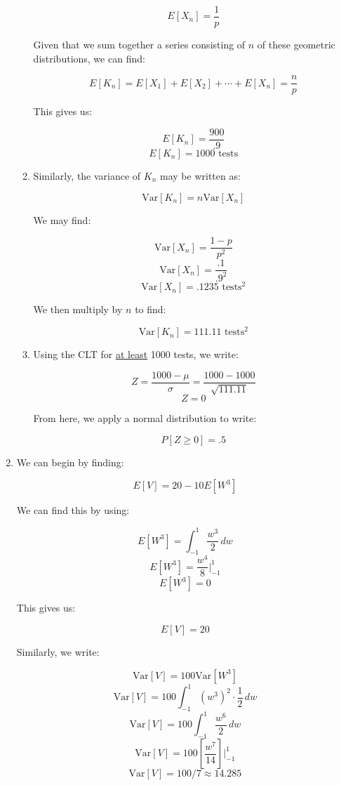 \begin{enumerate}
\begin{enumerate}
        $$E[X_n]=\frac{1}{p}$$

        Given that we sum together a series consisting of $n$ of these geometric distributions, we can find:

        $$E[K_n]=E[X_1]+E[X_2]+\cdots+E[X_n]=\frac{n}{p}$$

        This gives us:

        $$E[K_n]=\frac{900}{.9}$$
        $$\boxed{E[K_n]=1000\text{ tests}}$$

      \item Similarly, the variance of $K_n$ may be written as:

        $$\text{Var}[K_n]=n\text{Var}[X_n]$$

        We may find:

        $$\text{Var}[X_n]=\frac{1-p}{p^2}$$
        $$\text{Var}[X_n]=\frac{.1}{.9^2}$$
        $$\boxed{\text{Var}[X_n]=.1235\text{ tests}^2}$$

        We then multiply by $n$ to find:

        $$\boxed{\text{Var}[K_n]=111.11\text{ tests}^2}$$

      \item Using the CLT for \underline{at least} 1000 tests, we write:

        $$Z=\frac{1000-\mu}{\sigma}=\frac{1000-1000}{\sqrt{111.11}}$$
        $$Z=0$$

        From here, we apply a normal distribution to write:

        $$\boxed{P[Z\geq 0]=.5}$$

    \end{enumerate}

  \item We can begin by finding:

    $$E[V]=20-10E[W^3]$$

    We can find this by using:

    $$E[W^3]=\int_{-1}^1 \frac{w^3}{2}\,dw$$
    $$E[W^3]=\frac{w^4}{8}\Big|_{-1}^1$$
    $$E[W^3]=0$$

    This gives us:

    $$E[V]=20$$

    Similarly, we write:

    $$\text{Var}[V]=100\text{Var}[W^3]$$
    $$\text{Var}[V]=100\int_{-1}^1 (w^3)^2\cdot\frac{1}{2}\,dw$$
    $$\text{Var}[V]=100\int_{-1}^1 \frac{w^6}{2}\,dw$$
    $$\text{Var}[V]=100\left[\frac{w^7}{14}\right]\Big|_{-1}^1$$
    $$\text{Var}[V]=100/7\approx 14.285$$


\end{enumerate}

